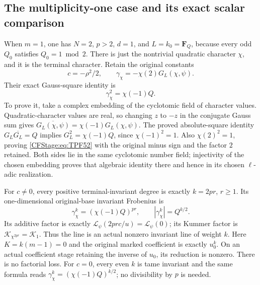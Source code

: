 \subsection{The multiplicity-one case and its exact scalar comparison}

When \(m=1\), one has \(N=2\), \(p>2\),
\(d=1\), and \(L=k_0=\mathbf F_Q\), because
every odd \(Q_0\) satisfies \(Q_0=1\bmod2\).
There is just the nontrivial quadratic
character \(\chi\), and it is the terminal
character. Retain the original constants
\[
 c=-\rho^2/2,\qquad
 \gamma_\chi=-\chi(2)G_L(\chi,\psi).
 \tag{TPF.51}\label{CFStage:eq:TPF51}
\]
Their exact Gauss-square identity is
\[
 \gamma_\chi^2=\chi(-1)Q.
 \tag{TPF.52}\label{CFStage:eq:TPF52}
\]
To prove it, take a complex embedding of the
cyclotomic field of character values.
Quadratic-character values are real, so
changing \(z\) to \(-z\) in the conjugate
Gauss sum gives
\(\overline{G_L(\chi,\psi)}
 =\chi(-1)G_L(\chi,\psi)\).
The proved absolute-square identity
\(G_L\overline{G_L}=Q\) implies
\(G_L^2=\chi(-1)Q\), since \(\chi(-1)^2=1\).
Also \(\chi(2)^2=1\), proving
\eqref{CFStage:eq:TPF52} with the original minus
sign and the factor \(2\) retained.
Both sides lie in the same cyclotomic
number field; injectivity of the chosen
embedding proves that algebraic identity
there and hence in its chosen \(\ell\)-adic
realization.

For \(c\ne0\), every positive terminal-invariant
degree is exactly \(k=2pr\), \(r\ge1\).
Its one-dimensional original-base invariant
Frobenius is
\[
 \gamma_\chi^k
      =(\chi(-1)Q)^{pr},\qquad
 |\gamma_\chi^k|=Q^{k/2}.
 \tag{TPF.53}\label{CFStage:eq:TPF53}
\]
Its additive factor is exactly
\(\mathcal L_\psi(2prc/u)=\mathcal L_\psi(0)\);
its Kummer factor is
\(\mathcal K_{\chi^{2pr}}=\mathcal K_1\).
Thus the line is an actual nonzero invariant
line of weight \(k\).
Here \(K=k(m-1)=0\) and the original marked
coefficient is exactly \(u_0^k\).
On an actual coefficient stage retaining
the inverse of \(u_0\), its reduction is
nonzero. There is no factorial loss.
For \(c=0\), every even \(k\) is tame
invariant and the same formula reads
\(\gamma_\chi^k=(\chi(-1)Q)^{k/2}\);
no divisibility by \(p\) is needed.

